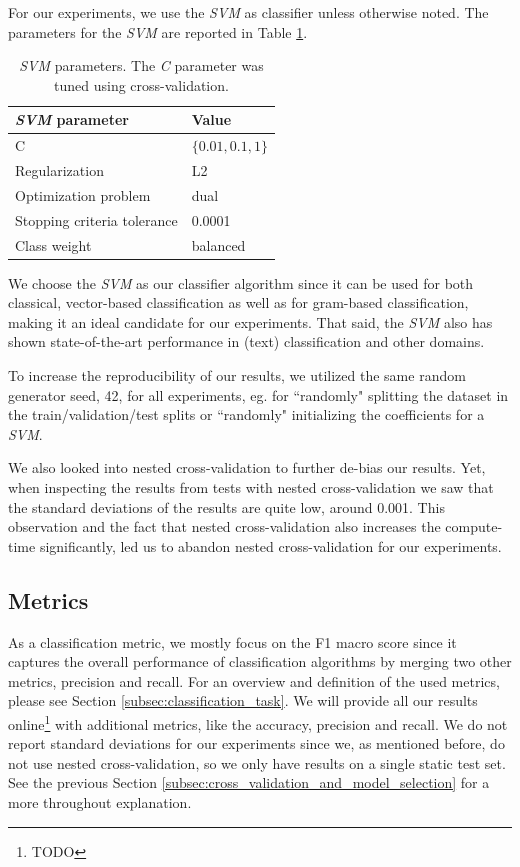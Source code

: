 For our experiments, we use the \textit{SVM}\cite{Cortes1995} as classifier unless otherwise noted.
The parameters for the \textit{SVM} are reported in Table \ref{table:svm_parameters}.

\begin{table}[htb!]
	\centering
	\begin{tabular}{ll}
		\textit{SVM} parameter & Value  \\
		\toprule
		C & $\{0.01, 0.1, 1\}$ \\
		Regularization & L2 \\
		Optimization problem & dual \\
		Stopping criteria tolerance & 0.0001 \\
		Class weight & balanced \\
		\bottomrule
	\end{tabular}
	\caption[Table: SVM parameters]{\textit{SVM} parameters. The \textit{C} parameter was tuned using cross-validation.}%
	\label{table:svm_parameters}
\end{table}

We choose the \textit{SVM} as our classifier algorithm since it can be used for both classical, vector-based classification as well as for gram-based classification, making it an ideal candidate for our experiments.
That said, the \textit{SVM} also has shown state-of-the-art performance in (text) classification and other domains.

To increase the reproducibility of our results, we utilized the same random generator seed, 42, for all experiments, eg. for ``randomly" splitting the dataset in the train/validation/test splits or ``randomly" initializing the coefficients for a \textit{SVM}.

We also looked into nested cross-validation to further de-bias our results. Yet, when inspecting the results from tests with nested cross-validation we saw that the standard deviations of the results are quite low, around 0.001.
This observation and the fact that nested cross-validation also increases the compute-time significantly, led us to abandon nested cross-validation for our experiments.


\subsection{Metrics}
As a classification metric, we mostly focus on the F1 macro score since it captures the overall performance of classification algorithms by merging two other metrics, precision and recall.
For an overview and definition of the used metrics, please see Section \ref{subsec:classification_task}.
We will provide all our results online\footnote{TODO} with additional metrics, like the accuracy, precision and recall.
We do not report standard deviations for our experiments since we, as mentioned before, do not use nested cross-validation, so we only have results on a single static test set.
See the previous Section \ref{subsec:cross_validation_and_model_selection} for a more throughout explanation.

